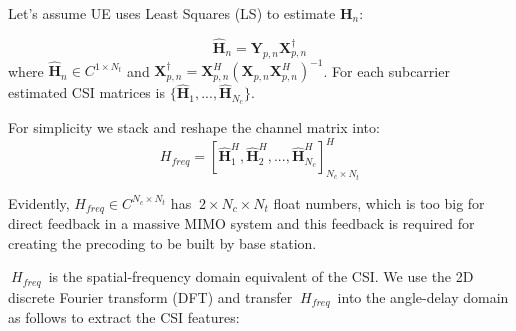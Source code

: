 \documentclass[lettersize,journal]{IEEEtran}
\begin{document}
Let's assume UE uses Least Squares (LS) to estimate \begin{math} \textbf{H}_{n} \end{math}:


\begin{equation}
	\hat{\textbf{H}}_{n}=\textbf{Y}_{p,n}\textbf{X}^{\dag}_{p,n}
\end{equation}
where 
\begin{math}
	\hat{\textbf{H}}_{n} \in C^{1\times N_{t}} 
\end{math} and
 \begin{math} \textbf{X}_{p,n}^{\dag}= \textbf{X}^{H}_{p,n}(\textbf{X}_{p,n}\textbf{X}^{H}_{p,n})^{-1} \end{math}.
For each subcarrier estimated CSI matrices is 
\begin{math}
	\{  \hat{\textbf{H}}_{1},...,\hat{\textbf{H}}_{N_{c}} \}
\end{math}.




For simplicity we stack and reshape the channel matrix into:
\begin{equation}
		H_{freq}=\left[\hat{\textbf{H}}_{1}^{H},\hat{\textbf{H}}_{2}^{H},...,\hat{\textbf{H}}_{N_{c}}^{H}\right]^{H}_{N_{c}\times N_{t}}
\end{equation}

Evidently, \begin{math} H_{freq} \in C^{N_{c}\times N_{t}}\end{math} has \begin{math}\ 2\times N_{c}\times N_{t}\end{math} float numbers, which is too big for direct feedback in a massive MIMO system and this feedback is required for creating
the precoding to be built by base station.

\begin{math}\ H_{freq}\end{math} is the spatial-frequency domain equivalent of the CSI. We use the 2D discrete Fourier transform (DFT) and transfer \begin{math}\ H_{freq}\end{math} into the angle-delay domain as follows to extract the CSI features:
\end{document}
